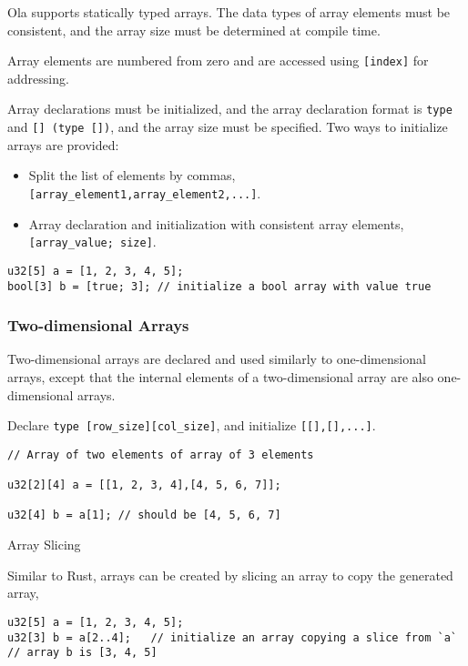 Ola supports statically typed arrays. The data types of array elements must be consistent, and the array size must be determined at compile time. 

Array elements are numbered from zero and are accessed using \texttt{[index]} for addressing.

Array declarations must be initialized, and the array declaration format is \texttt{type} and \texttt{[] (\texttt{type []})}, and the array size must be specified.
Two ways to initialize arrays are provided:
\begin{itemize}
    \item Split the list of elements by commas, \texttt{[array\_element1,array\_element2,...]}.
    \item Array declaration and initialization with consistent array elements, \texttt{[array\_value; size]}.
\end{itemize}

\begin{lstlisting}
u32[5] a = [1, 2, 3, 4, 5]; 
bool[3] b = [true; 3]; // initialize a bool array with value true
\end{lstlisting}

\subsubsection*{Two-dimensional Arrays}

Two-dimensional arrays are declared and used similarly to one-dimensional arrays, except that the internal elements of a two-dimensional array are also one-dimensional arrays. 

Declare \texttt{type [row\_size][col\_size]}, and initialize \texttt{[[],[],...]}.

\begin{lstlisting}
// Array of two elements of array of 3 elements

u32[2][4] a = [[1, 2, 3, 4],[4, 5, 6, 7]];

u32[4] b = a[1]; // should be [4, 5, 6, 7]
\end{lstlisting}

Array Slicing

Similar to Rust, arrays can be created by slicing an array to copy the generated array,

\begin{lstlisting}
u32[5] a = [1, 2, 3, 4, 5];
u32[3] b = a[2..4];   // initialize an array copying a slice from `a`
// array b is [3, 4, 5]
\end{lstlisting}

